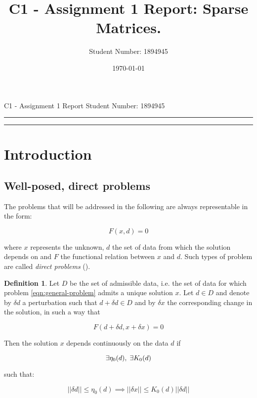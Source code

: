 \documentclass{article}
\title{C1 - Assignment 1 Report: Sparse Matrices.} %
\author{Student Number: 1894945} %
\date{\today} %
\theoremstyle{theorem}
\theoremstyle{definition}
\newtheorem{definition}{Definition}
\begin{document}
\maketitle %

\begin{center}
C1 - Assignment 1 Report \hfill
Student Number: 1894945
\vspace{3pt} \hrule \vspace{3pt} \hrule
\end{center}

\tableofcontents

\clearpage
\begin{abstract}


\end{abstract}
\clearpage 

\section{Introduction}

\subsection{Well-posed, direct problems}
The problems that will be addressed in the following are always representable in the form: 

\begin{equation}
	\label{eqn:general-problem}
	F(x, d) = 0
\end{equation}

where $x$ represents the unknown, $d$ the set of data from which the solution depends on and $F$ the functional relation between $x$ and $d$. Such types of problem are called \emph{direct problems} (\cite{numerical-math}).\\

\begin{definition}
	\label{defn:cont-dep}
	Let $D$ be the set of admissible data, i.e. the set of data for which problem \eqref{eqn:general-problem} admits a unique solution $x$. Let $d\in D$ and denote by $\delta d$ a perturbation such that $d + \delta d\in D$ and by $\delta x$ the corresponding change in the solution, in such a way that
	
	$$F(d+\delta d, x+\delta x) = 0$$
	
	Then the solution $x$ depends continuously on the data $d$ if
	
	$$\exists\eta_0(d),\hspace{1mm}\exists K_0(d)$$ 
	
	such that:
	
	$$||\delta d||\le\eta_0(d)\implies ||\delta x||\le K_0(d)||\delta d||$$
	 
\end{definition}
\end{document}
